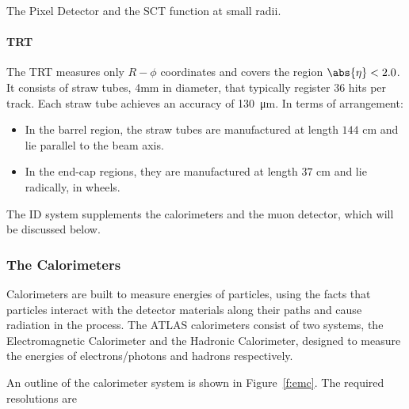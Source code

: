 \vspace{2mm}

The Pixel Detector and the SCT function at small radii.

\vspace{5mm}

\paragraph{TRT} The TRT measures only $R-\phi$ coordinates and covers the
region $\abs{\eta} < 2.0$. It consists of straw tubes, 4mm in diameter, that
typically register $36$ hits per track. Each straw tube achieves an accuracy of
\SI{130}{\micro\meter}. In terms of arrangement:

\begin{itemize}

	\item In the barrel region, the straw tubes are manufactured at length $144$ cm
	      and lie parallel to the beam axis.

	\item In the end-cap regions, they are manufactured at length $37$ cm and lie
	      radically, in wheels.

\end{itemize}


\vspace{5mm}


The ID system supplements the calorimeters and the muon detector, which will be
discussed below.

\subsubsection{The Calorimeters}

Calorimeters are built to measure energies of particles, using the facts that
particles interact with the detector materials along their paths and cause
radiation in the process. The ATLAS calorimeters \cite{lhcaccexp, atlasdreport}
consist of two systems, the Electromagnetic Calorimeter and the Hadronic
Calorimeter, designed to measure the energies of electrons/photons and hadrons
respectively.

An outline of the calorimeter system is shown in Figure~\ref{f:emc}. The
required resolutions are


